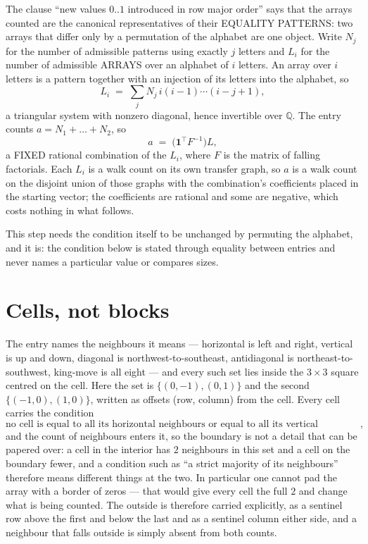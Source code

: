 \documentclass[11pt,a4paper]{article}
\theoremstyle{plain}
\theoremstyle{definition}
\begin{document}
The clause ``new values $0..1$ introduced in row major order'' says that the arrays
counted are the canonical representatives of their EQUALITY PATTERNS: two arrays that differ
only by a permutation of the alphabet are one object. Write $N_j$ for the number of admissible
patterns using exactly $j$ letters and $L_i$ for the number of admissible ARRAYS over an
alphabet of $i$ letters. An array over $i$ letters is a pattern together with an injection of
its letters into the alphabet, so
\[
L_i\;=\;\sum_{j}N_j\,i(i-1)\cdots(i-j+1),
\]
a triangular system with nonzero diagonal, hence invertible over $\mathbb{Q}$. The entry
counts $a=N_1+\dots+N_{2}$, so
\[
a\;=\;\bigl(\mathbf{1}^{\!\top}F^{-1}\bigr)L ,
\]
a FIXED rational combination of the $L_i$, where $F$ is the matrix of falling factorials.
Each $L_i$ is a walk count on its own transfer graph, so $a$ is a walk count on the disjoint
union of those graphs with the combination's coefficients placed in the starting vector; the
coefficients are rational and some are negative, which costs nothing in what follows.

This step needs the condition itself to be unchanged by permuting the alphabet, and it is:
the condition below is stated through equality between entries and never names a particular
value or compares sizes.

\section{Cells, not blocks}

The entry names the neighbours it means --- horizontal is left and right, vertical is up and
down, diagonal is northwest-to-southeast, antidiagonal is northeast-to-southwest, king-move is
all eight --- and every such set lies inside the $3\times3$ square centred on the cell. Here
the set is $\{(0,-1), (0,1)\}$ and the second $\{(-1,0), (1,0)\}$, written as offsets (row, column) from the cell. Every cell carries
the condition
\[
\text{no cell is equal to all its horizontal neighbours or equal to all its vertical neighbours},
\]
and the count of neighbours enters it, so the boundary is not a detail that can be papered
over: a cell in the interior has $2$ neighbours in this set and a cell on the boundary
fewer, and a condition such as ``a strict majority of its neighbours'' therefore means
different things at the two. In particular one cannot pad the array with a border of zeros ---
that would give every cell the full $2$ and change what is being counted. The outside is
therefore carried
explicitly, as a sentinel row above the first and below the last and as a sentinel column
either side, and a neighbour that falls outside is simply absent from both counts.
\end{document}
